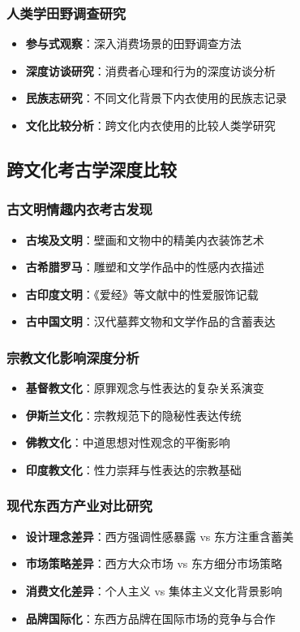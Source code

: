 \documentclass[12pt,UTF8]{ctexbook}
\begin{document}
\subsubsection{人类学田野调查研究}
\begin{itemize}[leftmargin=2cm]
	\item \textbf{参与式观察}：深入消费场景的田野调查方法
	\item \textbf{深度访谈研究}：消费者心理和行为的深度访谈分析
	\item \textbf{民族志研究}：不同文化背景下内衣使用的民族志记录
	\item \textbf{文化比较分析}：跨文化内衣使用的比较人类学研究
\end{itemize}

\subsection{跨文化考古学深度比较}
\subsubsection{古文明情趣内衣考古发现}
\begin{itemize}[leftmargin=2cm]
	\item \textbf{古埃及文明}：壁画和文物中的精美内衣装饰艺术
	\item \textbf{古希腊罗马}：雕塑和文学作品中的性感内衣描述
	\item \textbf{古印度文明}：《爱经》等文献中的性爱服饰记载
	\item \textbf{古中国文明}：汉代墓葬文物和文学作品的含蓄表达
\end{itemize}

\subsubsection{宗教文化影响深度分析}
\begin{itemize}[leftmargin=2cm]
	\item \textbf{基督教文化}：原罪观念与性表达的复杂关系演变
	\item \textbf{伊斯兰文化}：宗教规范下的隐秘性表达传统
	\item \textbf{佛教文化}：中道思想对性观念的平衡影响
	\item \textbf{印度教文化}：性力崇拜与性表达的宗教基础
\end{itemize}

\subsubsection{现代东西方产业对比研究}
\begin{itemize}[leftmargin=2cm]
	\item \textbf{设计理念差异}：西方强调性感暴露 vs 东方注重含蓄美
	\item \textbf{市场策略差异}：西方大众市场 vs 东方细分市场策略
	\item \textbf{消费文化差异}：个人主义 vs 集体主义文化背景影响
	\item \textbf{品牌国际化}：东西方品牌在国际市场的竞争与合作
\end{itemize}
\end{document}
